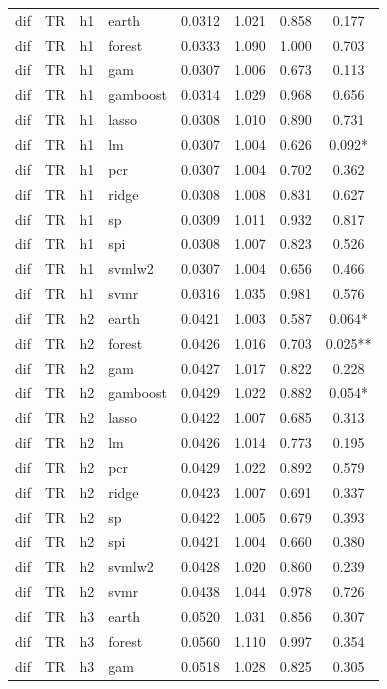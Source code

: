 \begin{ThreePartTable}
\begin{longtable}[t]{llclcccc}
\addlinespace
dif & TR & h1 & earth & 0.0312 & 1.021 & 0.858 & 0.177\\
dif & TR & h1 & forest & 0.0333 & 1.090 & 1.000 & 0.703\\
dif & TR & h1 & gam & 0.0307 & 1.006 & 0.673 & 0.113\\
dif & TR & h1 & gamboost & 0.0314 & 1.029 & 0.968 & 0.656\\
dif & TR & h1 & lasso & 0.0308 & 1.010 & 0.890 & 0.731\\
dif & TR & h1 & lm & 0.0307 & 1.004 & 0.626 & 0.092*\\
dif & TR & h1 & pcr & 0.0307 & 1.004 & 0.702 & 0.362\\
dif & TR & h1 & ridge & 0.0308 & 1.008 & 0.831 & 0.627\\
dif & TR & h1 & sp & 0.0309 & 1.011 & 0.932 & 0.817\\
dif & TR & h1 & spi & 0.0308 & 1.007 & 0.823 & 0.526\\
dif & TR & h1 & svmlw2 & 0.0307 & 1.004 & 0.656 & 0.466\\
dif & TR & h1 & svmr & 0.0316 & 1.035 & 0.981 & 0.576\\
\addlinespace
dif & TR & h2 & earth & 0.0421 & 1.003 & 0.587 & 0.064*\\
dif & TR & h2 & forest & 0.0426 & 1.016 & 0.703 & 0.025**\\
dif & TR & h2 & gam & 0.0427 & 1.017 & 0.822 & 0.228\\
dif & TR & h2 & gamboost & 0.0429 & 1.022 & 0.882 & 0.054*\\
dif & TR & h2 & lasso & 0.0422 & 1.007 & 0.685 & 0.313\\
dif & TR & h2 & lm & 0.0426 & 1.014 & 0.773 & 0.195\\
dif & TR & h2 & pcr & 0.0429 & 1.022 & 0.892 & 0.579\\
dif & TR & h2 & ridge & 0.0423 & 1.007 & 0.691 & 0.337\\
dif & TR & h2 & sp & 0.0422 & 1.005 & 0.679 & 0.393\\
dif & TR & h2 & spi & 0.0421 & 1.004 & 0.660 & 0.380\\
dif & TR & h2 & svmlw2 & 0.0428 & 1.020 & 0.860 & 0.239\\
dif & TR & h2 & svmr & 0.0438 & 1.044 & 0.978 & 0.726\\
\addlinespace
dif & TR & h3 & earth & 0.0520 & 1.031 & 0.856 & 0.307\\
dif & TR & h3 & forest & 0.0560 & 1.110 & 0.997 & 0.354\\
dif & TR & h3 & gam & 0.0518 & 1.028 & 0.825 & 0.305\\

\end{longtable}
\end{ThreePartTable}
